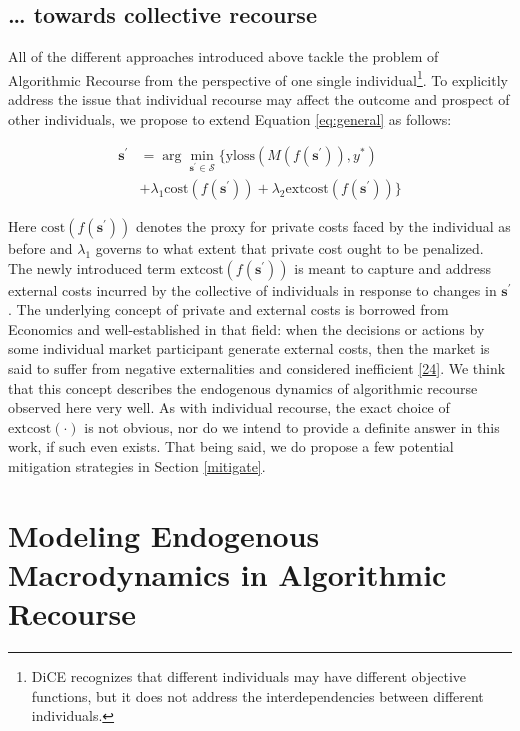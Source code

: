 \documentclass[conference,final,]{IEEEtran}
\theoremstyle{definition}
\theoremstyle{definition}
\theoremstyle{definition}
\theoremstyle{definition}
\theoremstyle{remark}
\begin{document}
\hypertarget{method-collective}{%
\subsection{\ldots{} towards collective recourse}\label{method-collective}}

All of the different approaches introduced above tackle the problem of Algorithmic Recourse from the perspective of one single individual\footnote{DiCE recognizes that different individuals may have different objective functions, but it does not address the interdependencies between different individuals.}. To explicitly address the issue that individual recourse may affect the outcome and prospect of other individuals, we propose to extend Equation \eqref{eq:general} as follows:

\begin{equation}
\begin{aligned}
\mathbf{s}^\prime &= \arg \min_{\mathbf{s}^\prime \in \mathcal{S}} \{ {\text{yloss}(M(f(\mathbf{s}^\prime)),y^*)} \\ &+ \lambda_1 {\text{cost}(f(\mathbf{s}^\prime))} + \lambda_2 {\text{extcost}(f(\mathbf{s}^\prime))} \}  \label{eq:collective}
\end{aligned} 
\end{equation}

Here \(\text{cost}(f(\mathbf{s}^\prime))\) denotes the proxy for private costs faced by the individual as before and \(\lambda_1\) governs to what extent that private cost ought to be penalized. The newly introduced term \(\text{extcost}(f(\mathbf{s}^\prime))\) is meant to capture and address external costs incurred by the collective of individuals in response to changes in \(\mathbf{s}^\prime\). The underlying concept of private and external costs is borrowed from Economics and well-established in that field: when the decisions or actions by some individual market participant generate external costs, then the market is said to suffer from negative externalities and considered inefficient \protect\hyperlink{ref-pindyck2014microeconomics}{{[}24{]}}. We think that this concept describes the endogenous dynamics of algorithmic recourse observed here very well. As with individual recourse, the exact choice of \(\text{extcost}(\cdot)\) is not obvious, nor do we intend to provide a definite answer in this work, if such even exists. That being said, we do propose a few potential mitigation strategies in Section \ref{mitigate}.

\hypertarget{method-2}{%
\section{Modeling Endogenous Macrodynamics in Algorithmic Recourse}\label{method-2}}
\end{document}
